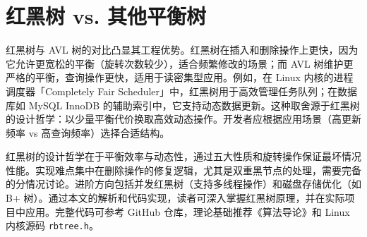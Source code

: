 \chapter{红黑树 vs. 其他平衡树}
红黑树与 AVL 树的对比凸显其工程优势。红黑树在插入和删除操作上更快，因为它允许更宽松的平衡（旋转次数较少），适合频繁修改的场景；而 AVL 树维护更严格的平衡，查询操作更快，适用于读密集型应用。例如，在 Linux 内核的进程调度器「Completely Fair Scheduler」中，红黑树用于高效管理任务队列；在数据库如 MySQL InnoDB 的辅助索引中，它支持动态数据更新。这种取舍源于红黑树的设计哲学：以少量平衡代价换取高效动态操作。开发者应根据应用场景（高更新频率 vs 高查询频率）选择合适结构。\par
红黑树的设计哲学在于平衡效率与动态性，通过五大性质和旋转操作保证最坏情况性能。实现难点集中在删除操作的修复逻辑，尤其是双重黑节点的处理，需要完备的分情况讨论。进阶方向包括并发红黑树（支持多线程操作）和磁盘存储优化（如 B+ 树）。通过本文的解析和代码实现，读者可深入掌握红黑树原理，并在实际项目中应用。完整代码可参考 GitHub 仓库，理论基础推荐《算法导论》和 Linux 内核源码 \texttt{rbtree.h}。\par
